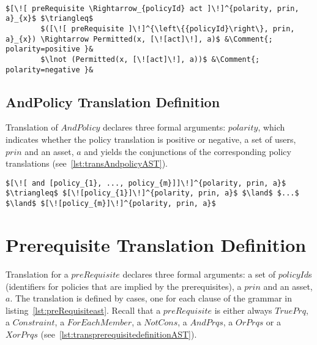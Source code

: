 \lstset{mathescape, language=AST} 
\begin{lstlisting}[frame=single, caption={PrimitivePolicy Translation Definition},label={lst:transprimitivepolicyAST}]

$[\![ preRequisite \Rightarrow_{policyId} act ]\!]^{polarity, prin, a}_{x}$ $\triangleq$ 
        $([\![ preRequisite ]\!]^{\left\{{policyId}\right\}, prin, a}_{x}) \Rightarrow Permitted(x, [\![act]\!], a)$ &\Comment{; polarity=positive }&
        $\lnot (Permitted(x, [\![act]\!], a))$ &\Comment{; polarity=negative }&

\end{lstlisting}


\subsection{AndPolicy Translation Definition}
Translation of $AndPolicy$ declares three formal arguments: $polarity$, which indicates whether the policy translation is positive or negative, a set of users, $prin$ and an asset, $a$ and yields the conjunctions of the corresponding policy translations (see~\ref{lst:transAndpolicyAST}). 

\lstset{mathescape, language=AST}  
\begin{lstlisting}[frame=single, caption={Policy Translation Definition {$\colon$} AndPolicy},label={lst:transAndpolicyAST}]
$[\![ and [policy_{1}, ..., policy_{m}]]\!]^{polarity, prin, a}$ $\triangleq$ $[\![policy_{1}]\!]^{polarity, prin, a}$ $\land$ $...$ $\land$ $[\![policy_{m}]\!]^{polarity, prin, a}$

\end{lstlisting}




\section{Prerequisite Translation Definition}

Translation for a $preRequisite$ declares three formal arguments: a set of $policyId$s (identifiers for policies that are implied by the prerequisites), a $prin$ and an asset, $a$. The translation is defined by cases, one for each clause of the grammar in listing~\ref{lst:preRequisiteast}. Recall that a $preRequisite$ is either always $TruePrq$, a $Constraint$, a $ForEachMember$, a $NotCons$, a $AndPrqs$, a $OrPrqs$ or a $XorPrqs$ (see~\ref{lst:transprerequisitedefinitionAST}). 

